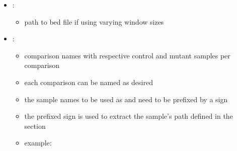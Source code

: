 \documentclass[letterpaper,10pt,english]{sphinxhowto}
\begin{document}
\begin{sphinxVerbatim}[commandchars=\\\{\}]
    
    
    
\end{sphinxVerbatim}
\begin{itemize}
\item {} 
\sphinxAtStartPar
{}:
\begin{itemize}
\item {} 
\sphinxAtStartPar
path to bed file if using varying window sizes

\end{itemize}

\item {} 
\sphinxAtStartPar
{}:
\begin{itemize}
\item {} 
\sphinxAtStartPar
comparison names with respective control and mutant samples per comparison

\item {} 
\sphinxAtStartPar
each comparison can be named as desired

\item {} 
\sphinxAtStartPar
the sample names to be used as  and  need to be prefixed by a \sphinxtitleref{*} sign

\item {} 
\sphinxAtStartPar
the \sphinxtitleref{*} prefixed sign is used to extract the sample’s path defined in the  section

\item {} 
\sphinxAtStartPar
example:

\end{itemize}

\end{itemize}
\end{document}
